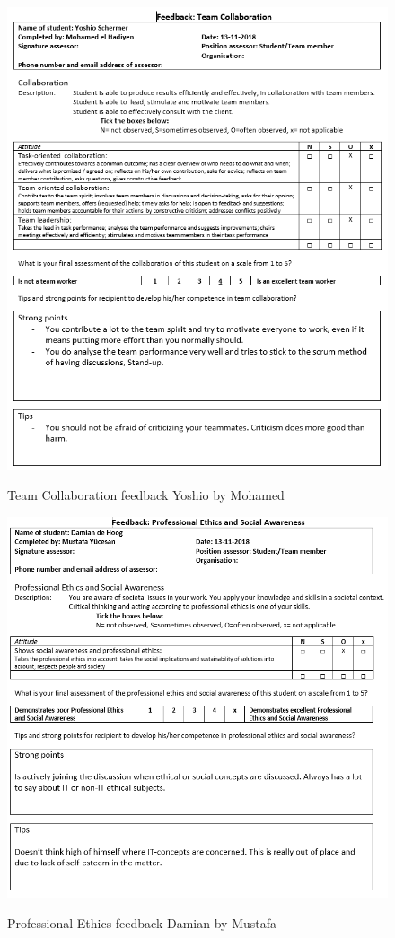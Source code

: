 \documentclass[12pt]{article}
\begin{document}
	\begin{figure}[p!]
		\centering
		\includegraphics[width=\columnwidth]{CoopYoshio1.PNG}\\
		\caption{Team Collaboration feedback Yoshio by Mohamed}
	\end{figure}
	\begin{figure}[p!]
		\centering
		\includegraphics[width=\columnwidth]{ProfEthDamian2.PNG}\\
		\caption{Professional Ethics feedback Damian by Mustafa}
	\end{figure}
\end{document}
